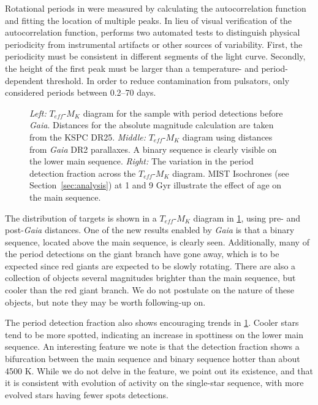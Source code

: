 \documentclass[manuscript]{aastex6}
\newcommand{\Gaia}{\mbox{\textit{Gaia}}}
\newcommand{\Teff}{\ensuremath{T_{eff}}}
\begin{document}
Rotational periods in \citet{McQuillan14} were measured by calculating the 
autocorrelation function and fitting the location of multiple peaks. In lieu 
of visual verification of the autocorrelation function, \citet{McQuillan14}
performs two automated tests to distinguish physical periodicity from
instrumental artifacts or other sources of variability. First, the 
periodicity must be consistent in different segments of the light curve.
Secondly, the height of the first peak must be larger than a temperature- and
period-dependent threshold. In order to reduce contamination from pulsators, 
\citet{McQuillan14} only considered periods between 0.2--70 days.

\begin{figure}[htb]
    \centering
    \caption{\emph{Left:} \Teff-\(M_K\) diagram for the \citet{McQuillan14}
        sample with period detections before \Gaia{}. Distances for the 
        absolute magnitude calculation are taken from the KSPC DR25. 
        \emph{Middle:} \Teff-\(M_K\) diagram using distances from \Gaia{} DR2 
        parallaxes. A binary sequence is clearly visible on the lower main 
        sequence. \emph{Right:} The variation in the \citet{McQuillan14} 
    period detection fraction across the \Teff-\(M_K\) diagram. MIST Isochrones
    (see Section~\ref{sec:analysis}) at 1 and 9 Gyr illustrate the effect of age
    on the main sequence.}\label{fig:mcquillan_selection}
\end{figure}

The distribution of \citet{McQuillan14} targets is shown in a \Teff-\(M_K\)
diagram in \cref{fig:mcquillan_selection}, using pre- and post-\Gaia{}
distances. One of the new results enabled by \Gaia{} is that a binary sequence,
located above the main sequence, is clearly seen. Additionally, many of the
period detections on the giant branch have gone away, which is to be expected
since red giants are expected to be slowly rotating. There are also a
collection of objects several magnitudes brighter than the main sequence, but
cooler than the red giant branch. We do not postulate on the nature of these
objects, but note they may be worth following-up on.

The period detection fraction also shows encouraging trends in
\cref{fig:mcquillan_selection}. Cooler stars tend
to be more spotted, indicating an increase in spottiness on the lower main
sequence. An interesting feature we note is that the detection fraction shows a
bifurcation between the main sequence and binary sequence hotter than about
4500 K. While we do not delve in the feature, we point out its existence, and
that it is consistent with evolution of activity on the single-star sequence, 
with more evolved stars having fewer spots detections.
\end{document}
